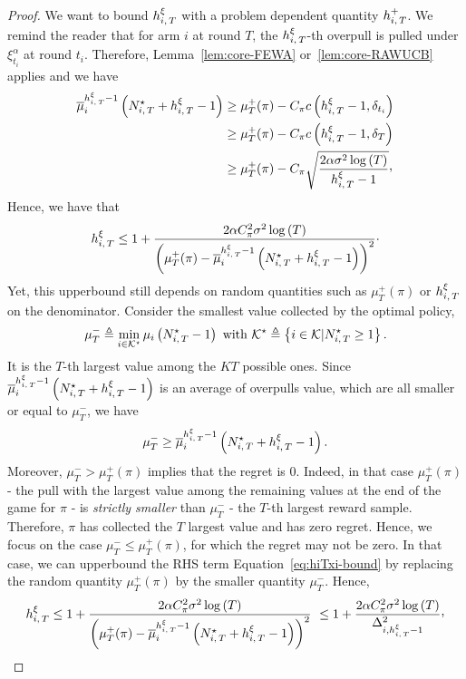 \begin{proof}

We want to bound $h_{i,\,T}^\xi $ with a problem dependent quantity $h_{i,\,T}^+$. We remind the reader that for arm $i$ at round $T$, the $h_{i,\,T}^\xi$-th overpull is pulled under $\xi^\alpha_{t_i}$ at round $t_i$. Therefore, Lemma~\ref{lem:core-FEWA} or~\ref{lem:core-RAWUCB} applies and we have
\begin{align*}
\bmu_i^{\hiT^\xi  - 1} \left( \NiT^\star + \hiT^\xi   - 1 \right) &\geq \mu_T^+(\pi) - C_\pi c\pa{\hiT^\xi   - 1, \delta_{t_i}}
\\& \geq \mu_T^+(\pi) - C_\pi c\pa{\hiT^\xi   - 1, \delta_T}
\\& \geq \mu_T^+(\pi) - C_\pi \sqrt{\frac{2\alpha\sigma^2\log\pa{T}}{\hiT^\xi-1}}\CommaBin
\end{align*}
Hence, we have that 
\begin{equation}
\label{eq:hiTxi-bound}
h_{i,\,T}^\xi \leq 1 + \frac{2\alpha C_\pi^2 \sigma^2\log\left(T\right)}{\left(\mu_T^+(\pi)- \overline{\mu}_i^{h_{i,\,T}^\xi  - 1} \left( N_{i,\,T}^\star + h_{i,\,T}^\xi   - 1 \right) \right)^2 }\cdot
\end{equation}
%
Yet, this upperbound still depends on random quantities such as $\mu_T^+(\pi)$ or $h_{i,\,T}^\xi$ on the denominator. 
Consider the smallest value collected by the optimal policy, 
\[
\mu^-_T\triangleq \min_{i \in \mathcal{K}^\star} \mu_i \left(N_{i,\,T}^\star -1\right)\text{ with } \mathcal{K}^\star \triangleq\left\{ i \in \mathcal{K} | N_{i,\,T}^\star \geq 1 \right\}.
\]
It is the $T$-th largest value among the $KT$ possible ones. Since $\overline{\mu}_i^{h_{i,\,T}^\xi  - 1} \left( N_{i,\,T}^\star + h_{i,\,T}^\xi  - 1 \right)$ is an average of overpulls value, which are all smaller or equal to $\mu^-_T$, we have
\[\mu^-_T\geq \overline{\mu}_i^{h_{i,\,T}^\xi  - 1} \left( N_{i,\,T}^\star + h_{i,\,T}^\xi   - 1 \right).\] 
%
Moreover, $\mu_T^- > \mu_T^+(\pi)$ implies that the regret is 0. Indeed, in that case $\mu_T^+(\pi)$ - the pull with the largest value among the remaining values at the end of the game for $\pi$ - is \emph{strictly smaller} than $\mu_T^-$ - the $T$-th largest reward sample.  Therefore, $\pi$ has collected the $T$ largest value and has zero regret. Hence, we focus on the case $\mu^-_T\leq \mu^+_T(\pi)$, for which the regret may not be zero.  In that case, we can upperbound the RHS term Equation~\ref{eq:hiTxi-bound} by replacing the random quantity $\mu_T^+(\pi)$ by the smaller quantity $\mu^-_T$. Hence, 
\[
\hiT^\xi \leq 1 + \frac{2\alpha C_\pi^2 \sigma^2\log\pa{T}}{\pa{\mu_T^+(\pi)- \bmu_i^{\hiT^\xi  - 1} \left( \NiT^\star + \hiT^\xi   - 1 \right) }^2 }\ \leq 1 + \frac{2\alpha C_\pi^2 \sigma^2\log\pa{T}}{\Delta_{i,\hiT^\xi  - 1}^2}\CommaBin
\]
\end{proof}
